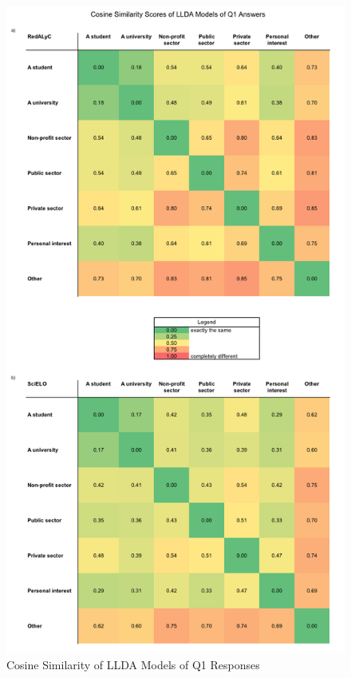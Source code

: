 \begin{figure}[htbp]
\centering
\includegraphics[keepaspectratio,width=\textwidth,height=0.95\textheight]{figures/llda_cosine_similarity_q1.png}
\caption{Cosine Similarity of LLDA Models of Q1 Responses}
\label{llda_cosine_similarity_q1}
\end{figure}

